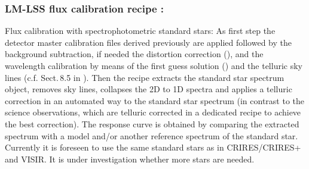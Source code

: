 \subsubsection{LM-LSS flux calibration recipe :}\label{rec:lsslmflux}
Flux calibration with spectrophotometric standard stars: As first step the detector master calibration files derived previously are applied followed by the background subtraction, if needed the distortion correction (\hyperref[dataitem:lmlssdistsol]{}), and
the wavelength calibration by means of the first guess solution (\hyperref[dataitem:lmlsswaveguess]{}) and the telluric sky lines (c.f. Sect.\,8.5 in \cite{DRLS}). Then the recipe extracts the standard star spectrum object, removes sky lines, collapses the 2D to 1D spectra and applies a telluric correction in an automated way to the standard star spectrum (in contrast to the science observations, which are telluric corrected in a dedicated recipe to achieve the best correction). The response curve is obtained by comparing the extracted spectrum with a model and/or another reference spectrum of the standard star. Currently it is foreseen to use the same standard stars as in \ac{CRIRES}/CRIRES+ and \ac{VISIR}. It is under investigation whether more stars are needed.
